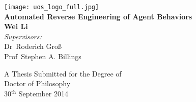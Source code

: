 \begin{titlepage}
\begin{center}


\texttt{[image: uos\_logo\_full.jpg]}~\\[2.0cm]

\textsf{{\Huge \bfseries Automated Reverse Engineering of Agent Behaviors}}~\\[1cm]

\textsf{{\Large \bfseries Wei Li}}~\\[4cm]

{\Large \emph{Supervisors:}~\\
Dr~Roderich Gro\ss~\\
Prof~Stephen A. Billings~\\[1cm]}

{\Large A Thesis Submitted for the Degree of~\\
Doctor of Philosophy}~\\[1cm]

{\Large 30$^\textrm{th}$ September 2014}

\end{center}
\end{titlepage}

